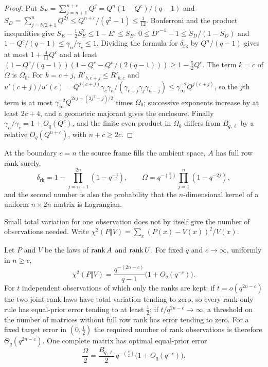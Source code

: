 \begin{proof}
Put $S_E=\sum_{j=n+1}^{n+c}Q^j=Q^n(1-Q^c)/(q-1)$ and $S_D=\sum_{j=b/2+1}^{n}Q^{2j}\le Q^{n+c}/(q^2-1)\le\tfrac1{12}$.
Bonferroni and the product inequalities give $S_E-\tfrac12S_E^2\le1-E'\le S_E$,
$0\le D'^{-1}-1\le S_D/(1-S_D)$ and $1-Q^c/(q-1)\le \gamma_n/\gamma_c\le1$. Dividing the formula for
$\delta_{\mathrm{rk}}$ by $Q^n/(q-1)$ gives at most $1+\tfrac4{11}Q^c$ and at least
$(1-Q^c/(q-1))(1-Q^c-Q^n/(2(q-1)))\ge1-\tfrac52Q^c$. The term $k=c$ of $\Omega$ is $\Omega_0$. For
$k=c+j$, $R'_{b,c+j}\le R'_{b,c}$ and
$u'(c+j)/u'(c)=Q^{j(c+j)}\gamma_c\gamma_n/(\gamma_{c+j}\gamma_j\gamma_{n-j})\le \gamma_\infty^{-2}Q^{j(c+j)}$, so the $j$th term
is at most $\gamma_\infty^{-2}Q^{2cj+(3j^2-j)/2}$ times $\Omega_0$; successive exponents increase by at
least $2c+4$, and a geometric majorant gives the enclosure. Finally $\gamma_n/\gamma_c=1+O_q(Q^c)$, and the
finite even product in $\Omega_0$ differs from $B_{q,\ell}$ by a relative $O_q(Q^{n+c})$, with
$n+c\ge2c$.
\end{proof}

At the boundary $c=n$ the source frame fills the ambient space, $A$ has full row rank surely,
\[
 \delta_{\mathrm{rk}}=1-\prod_{j=n+1}^{2n}(1-q^{-j}),\qquad\Omega=q^{-\binom n2}\prod_{j=1}^n(1-q^{-2j}),
\]
and the second number is also the probability that the $n$-dimensional kernel of a uniform $n\times2n$
matrix is Lagrangian.

Small total variation for one observation does not by itself give the number of observations needed.
Write $\chi^2(P\Vert V)=\sum_x(P(x)-V(x))^2/V(x)$.

\begin{theorem}\label{spn:thm:wide-sample}
Let $P$ and $V$ be the laws of $\operatorname{rank} A$ and $\operatorname{rank} U$. For fixed $q$ and $c\to\infty$, uniformly in
$n\ge c$,
\[
 \chi^2(P\Vert V)=\frac{q^{-(2n-c)}}{q-1}\bigl(1+O_q(q^{-c})\bigr).
\]
For $t$ independent observations of which only the ranks are kept: if $t=o(q^{2n-c})$ the two joint
rank laws have total variation tending to zero, so every rank-only rule has equal-prior error
tending to at least $\tfrac12$; if $t/q^{2n-c}\to\infty$, a threshold on the number of matrices
without full row rank has error tending to zero. For a fixed target error in $(0,\tfrac12)$ the
required number of rank observations is therefore $\Theta_q(q^{2n-c})$. One complete matrix has
optimal equal-prior error
\[
 \frac\Omega2=\frac{B_{q,\ell}}2\,q^{-\binom c2}\bigl(1+O_q(q^{-c})\bigr).
\]
\end{theorem}

